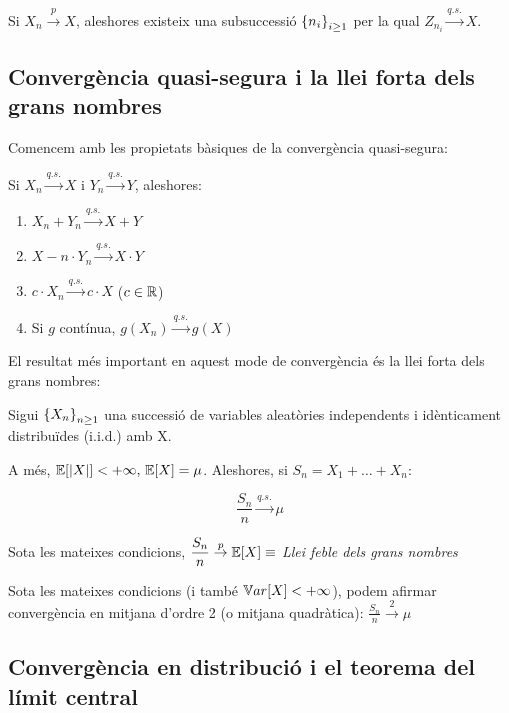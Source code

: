 \begin{prop}
  Si $X_n \overset{p}{\to} X$, aleshores existeix una subsuccessió $\left\{n_i\right\}_{i\geq 1}$ per la qual $Z_{n_i}\overset{q.s.}{\longrightarrow} X$.
\end{prop}

\newpage

\subsection{Convergència quasi-segura i la llei forta dels grans nombres}

Comencem amb les propietats bàsiques de la convergència quasi-segura:

\begin{prop}
  Si $X_n \overset{q.s.}{\to} X$ i $Y_n \overset{q.s.}{\to} Y$, aleshores:
  \begin{enumerate}[label=\alph*)]
    \item $X_n + Y_n \overset{q.s.}{\longrightarrow} X+Y$
    \item $X-n \cdot Y_n \overset{q.s.}{\longrightarrow} X \cdot Y$
    \item $c \cdot X_n \overset{q.s.}{\longrightarrow} c \cdot X$ ($c\in \mathbb{R}$)
    \item Si $g$ contínua, $g(X_n) \overset{q.s.}{\longrightarrow} g(X)$
  \end{enumerate}
\end{prop}

El resultat més important en aquest mode de convergència és la llei forta dels grans nombres:

\begin{thm}
  Sigui $\left\{X_n\right\}_{n\geq 1}$ una successió de variables aleatòries independents i idènticament distribuïdes (i.i.d.) amb X.
  
  A més, $\mathbb{E}[\left\vert X \right\vert]<+\infty, \, \mathbb{E}[X] = \mu$. Aleshores, si $S_n = X_1 + \ldots + X_n$:
  
  \[
    \frac{S_n}{n} \overset{q.s.}{\longrightarrow}\mu 
  \]
\end{thm}

\begin{obs}
  Sota les mateixes condicions, $\dfrac{S_n}{n}\overset{p}{\to}\mathbb{E}[X] \equiv$ \textit{Llei feble dels grans nombres}
\end{obs}

\begin{obs}
  Sota les mateixes condicions (i també $\mathbb{V} ar[X]< +\infty$), podem afirmar convergència en mitjana d'ordre 2 (o mitjana quadràtica): $\frac{S_n}{n} \overset{2}{\to}\mu$
\end{obs}

\subsection{Convergència en distribució i el teorema del límit central}
